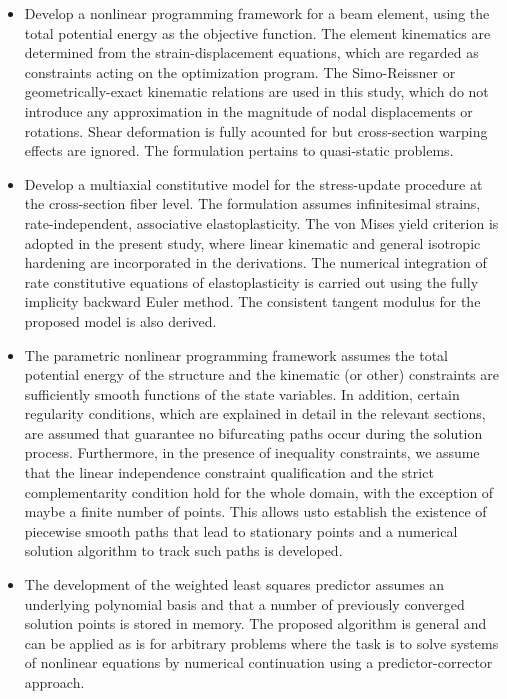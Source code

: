 \begin{itemize}
	\item Develop a nonlinear programming framework for a beam element, using the 
	total potential energy as the objective function. The element kinematics are 
	determined from the strain-displacement equations, which are regarded as 
	constraints acting on the optimization program. The Simo-Reissner or 
	geometrically-exact kinematic relations are used in this study, which do not 
	introduce any approximation in the magnitude of nodal displacements or rotations. 
	Shear deformation is fully acounted for but cross-section warping effects are 
	ignored. The formulation pertains to quasi-static problems.
	
	\item Develop a multiaxial constitutive model for the stress-update procedure at 
	the cross-section fiber level. The formulation assumes infinitesimal strains, 
	rate-independent, associative elastoplasticity. The von Mises yield criterion is 
	adopted in the present study, where linear kinematic and general isotropic 
	hardening are incorporated in the derivations. The numerical integration of rate 
	constitutive equations of elastoplasticity is carried out using the fully 
	implicity backward Euler method. The consistent tangent modulus for the proposed 
	model is also derived.
	
	\item The parametric nonlinear programming framework assumes the total potential 
	energy of the structure and the kinematic (or other) constraints are sufficiently 
	smooth functions of the state variables. In addition, certain regularity 
	conditions, which are explained in detail in the relevant sections, are assumed 
	that guarantee no bifurcating paths occur during the solution process. 
	Furthermore, in the presence of inequality constraints, we assume that the linear 
	independence constraint qualification and the strict complementarity condition 
	hold for the whole domain, with the exception of maybe a finite number of points. 
	This allows usto establish the existence of piecewise smooth paths that lead to 
	stationary points and a numerical solution algorithm to track such paths is 
	developed.
	
	\item The development of the weighted least squares predictor assumes an 
	underlying polynomial basis and that a number of previously converged solution 
	points is stored in memory. The proposed algorithm is general and can be applied 
	as is for arbitrary problems where the task is to solve systems of nonlinear 
	equations by numerical continuation using a predictor-corrector approach. 
\end{itemize}
